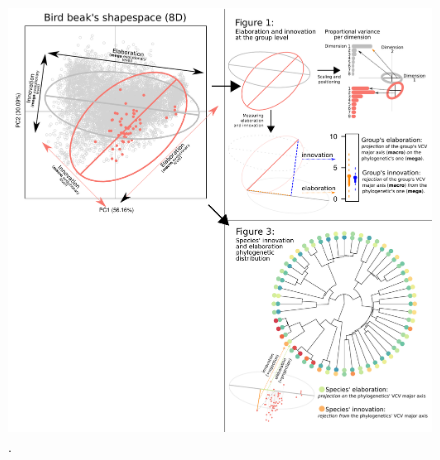 \documentclass[12pt,letterpaper]{article}
\begin{document}
\begin{figure}[!htbp]
\centering
   \includegraphics[width=1\textwidth]{Figures/cheat_sheet.pdf}
\caption{.}
\label{Fig:cheatsheet}
\end{figure}
\bigskip
\end{document}
